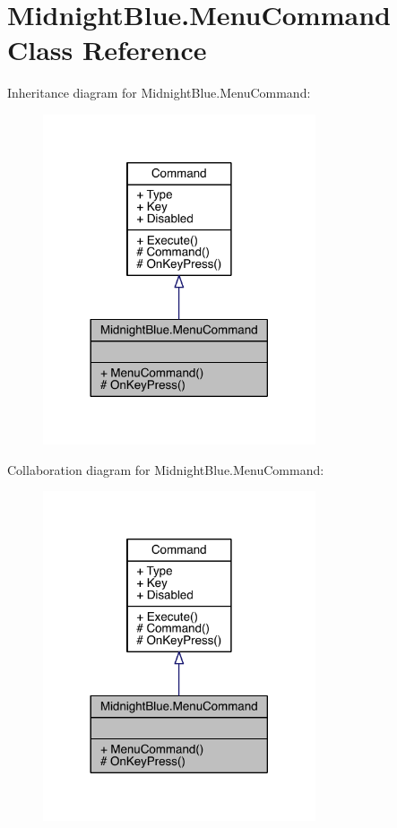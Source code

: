 \hypertarget{class_midnight_blue_1_1_menu_command}{}\section{Midnight\+Blue.\+Menu\+Command Class Reference}
\label{class_midnight_blue_1_1_menu_command}


Inheritance diagram for Midnight\+Blue.\+Menu\+Command\+:
\nopagebreak
\begin{figure}[H]
\begin{center}
\leavevmode
\includegraphics[width=228pt]{class_midnight_blue_1_1_menu_command__inherit__graph}
\end{center}
\end{figure}


Collaboration diagram for Midnight\+Blue.\+Menu\+Command\+:
\nopagebreak
\begin{figure}[H]
\begin{center}
\leavevmode
\includegraphics[width=228pt]{class_midnight_blue_1_1_menu_command__coll__graph}
\end{center}
\end{figure}
